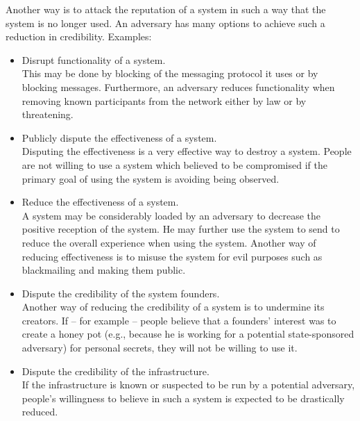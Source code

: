 Another way is to attack the reputation of a system in such a way that the system is no longer used. An adversary has many options to achieve such a reduction in credibility. Examples:
\begin{itemize}
	\item Disrupt functionality of a system.\\ 
	This may be done by blocking of the messaging protocol it uses or by blocking messages. Furthermore, an adversary reduces functionality when removing known participants from the network either by law or by threatening.
	\item Publicly dispute the effectiveness of a system.\\
	Disputing the effectiveness is a very effective way to destroy a system. People are not willing to use a system which believed to be compromised if the primary goal of using the system is avoiding being observed.
	\item Reduce the effectiveness of a system.\\
	A system may be considerably loaded by an adversary to decrease the positive reception of the system. He may further use the system to send  to reduce the overall experience when using the system. Another way of reducing effectiveness is to misuse the system for evil purposes such as blackmailing and making them public.
	\item Dispute the credibility of the system founders.\\
	Another way of reducing the credibility of a system is to undermine its creators. If -- for example -- people believe that a founders' interest was to create a honey pot (e.g., because he is working for a potential state-sponsored adversary) for personal secrets, they will not be willing to use it.
	\item Dispute the credibility of the infrastructure.\\
	If the infrastructure is known or suspected to be run by a potential adversary, people's willingness to believe in such a system is expected to be drastically reduced.
\end{itemize}

